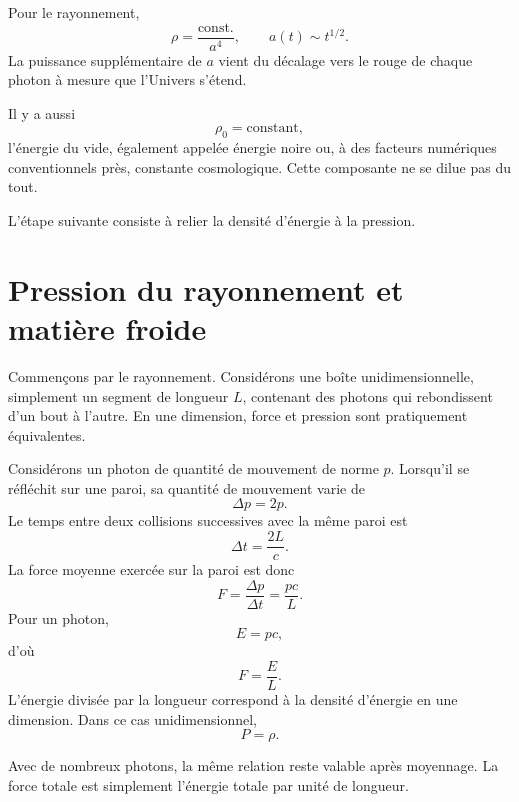 Pour le rayonnement,
\begin{equation}
\rho=\frac{\text{const.}}{a^4},
\qquad
a(t)\sim t^{1/2}.
\end{equation}
La puissance supplémentaire de \(a\) vient du décalage vers le rouge de chaque photon à mesure que l’Univers s’étend.

Il y a aussi
\begin{equation}
\rho_0=\text{constant},
\end{equation}
l’énergie du vide, également appelée énergie noire ou, à des facteurs numériques conventionnels près, constante cosmologique. Cette composante ne se dilue pas du tout.

L’étape suivante consiste à relier la densité d’énergie à la pression.

\section{Pression du rayonnement et matière froide}

Commençons par le rayonnement. Considérons une boîte unidimensionnelle, simplement un segment de longueur \(L\), contenant des photons qui rebondissent d’un bout à l’autre. En une dimension, force et pression sont pratiquement équivalentes.

Considérons un photon de quantité de mouvement de norme \(p\). Lorsqu’il se réfléchit sur une paroi, sa quantité de mouvement varie de
\begin{equation}
\Delta p = 2p.
\end{equation}
Le temps entre deux collisions successives avec la même paroi est
\begin{equation}
\Delta t = \frac{2L}{c}.
\end{equation}
La force moyenne exercée sur la paroi est donc
\begin{equation}
F=\frac{\Delta p}{\Delta t}=\frac{pc}{L}.
\end{equation}
Pour un photon,
\begin{equation}
E=pc,
\end{equation}
d’où
\begin{equation}
F=\frac{E}{L}.
\end{equation}
L’énergie divisée par la longueur correspond à la densité d’énergie en une dimension. Dans ce cas unidimensionnel,
\begin{equation}
P=\rho .
\end{equation}

Avec de nombreux photons, la même relation reste valable après moyennage. La force totale est simplement l’énergie totale par unité de longueur.

